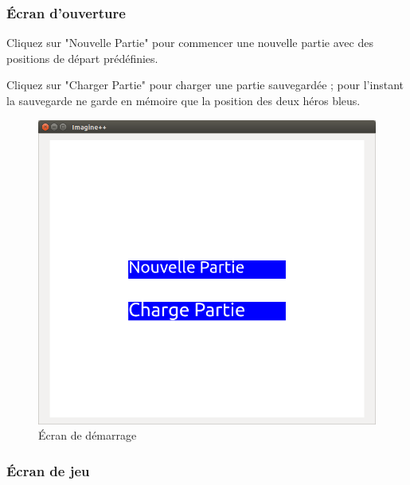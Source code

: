 \documentclass[11pt,a4paper]{article}
\begin{document}
\subsubsection{Écran d'ouverture}

Cliquez sur "Nouvelle Partie" pour commencer une nouvelle partie avec des positions de départ prédéfinies.

Cliquez sur "Charger Partie" pour charger une partie sauvegardée ; pour l'instant la sauvegarde ne garde en mémoire que la position des deux héros bleus.

\begin{figure}[h]
\begin{center}
\includegraphics[scale=0.5]{./ecran_de_demarrage.png}
\caption{Écran de démarrage}
\end{center}
\end{figure}

\clearpage

\subsubsection{Écran de jeu}
\end{document}
